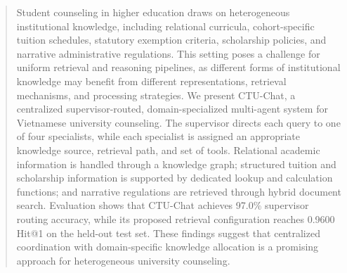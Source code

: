 \begin{abstract}
Student counseling in higher education draws on heterogeneous institutional knowledge, including relational curricula, cohort-specific tuition schedules, statutory exemption criteria, scholarship policies, and narrative administrative regulations. This setting poses a challenge for uniform retrieval and reasoning pipelines, as different forms of institutional knowledge may benefit from different representations, retrieval mechanisms, and processing strategies. We present CTU-Chat, a centralized supervisor-routed, domain-specialized multi-agent system for Vietnamese university counseling. The supervisor directs each query to one of four specialists, while each specialist is assigned an appropriate knowledge source, retrieval path, and set of tools. Relational academic information is handled through a knowledge graph; structured tuition and scholarship information is supported by dedicated lookup and calculation functions; and narrative regulations are retrieved through hybrid document search. Evaluation shows that CTU-Chat achieves 97.0\% supervisor routing accuracy, while its proposed retrieval configuration reaches 0.9600 Hit@1 on the held-out test set. These findings suggest that centralized coordination with domain-specific knowledge allocation is a promising approach for heterogeneous university counseling.

\end{abstract}
